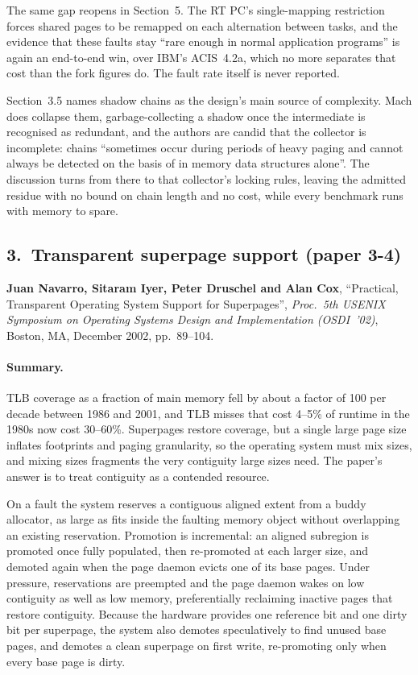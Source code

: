 The same gap reopens in Section~5. The RT PC's single-mapping restriction forces shared
pages to be remapped on each alternation between tasks, and the evidence that these faults
stay ``rare enough in normal application programs'' is again an end-to-end win, over IBM's
ACIS~4.2a,
which no more separates that cost than the fork figures do. The fault rate itself is never
reported.

Section~3.5 names shadow chains as the design's main source of complexity.
Mach does collapse them, garbage-collecting a shadow once the intermediate is recognised as
redundant, and the authors are candid that the collector is incomplete: chains ``sometimes
occur during periods of heavy paging and cannot always be detected on the basis of in
memory data structures alone''. The discussion turns from there to that collector's locking
rules, leaving the admitted residue with no bound on chain length and no cost, while every
benchmark runs with memory to spare.

\subsection*{3.~Transparent superpage support (paper 3-4)}

\noindent\textbf{Juan Navarro, Sitaram Iyer, Peter Druschel and Alan Cox},
``Practical, Transparent Operating System Support for Superpages'', \emph{Proc.\ 5th
USENIX Symposium on Operating Systems Design and Implementation (OSDI~'02)}, Boston,
MA, December 2002, pp.~89--104.

\paragraph{Summary.}
TLB coverage as a fraction of main memory fell by about a factor of 100 per decade
between 1986 and 2001, and TLB misses that cost 4--5\% of runtime in the 1980s now cost
30--60\%. Superpages restore coverage, but a single large page size inflates footprints
and paging granularity, so the operating system must mix sizes, and mixing sizes
fragments the very contiguity large sizes need. The paper's answer is to treat contiguity
as a contended resource.

On a fault the system reserves a contiguous aligned extent from a buddy allocator, as
large as fits inside the faulting memory object without overlapping an existing
reservation. Promotion is incremental: an aligned subregion is promoted once fully
populated, then re-promoted at each larger size, and demoted again when the page daemon
evicts one of its base pages. Under pressure, reservations are preempted and the page
daemon wakes on low contiguity as well as low memory, preferentially reclaiming inactive
pages that restore contiguity. Because the hardware provides one reference bit and one
dirty bit per superpage, the system also demotes speculatively to find unused base pages,
and demotes a clean superpage on first write, re-promoting only when every base page is
dirty.

